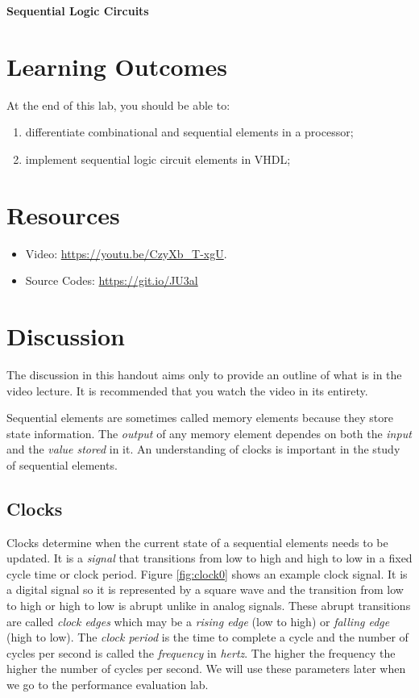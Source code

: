 \documentclass[a4paper, 11pt,oneside]{article}
\begin{document}
\begin{center}
	{\LARGE \textbf{Sequential Logic Circuits}}
\end{center}

\section*{Learning Outcomes}
   At the end of this lab, you should be able to:
   \begin{enumerate}[itemsep=0pt,parsep=0pt]
   	   \item differentiate combinational and sequential elements in a processor;
       \item implement sequential logic circuit elements in VHDL;
   \end{enumerate}   
\tableofcontents

\section{Resources}
\begin{itemize}
	\item Video: \href{https://youtu.be/CzyXb_T-xgU}{https://youtu.be/CzyXb\_T-xgU}.
	\item Source Codes: \href{https://git.io/JU3al}{https://git.io/JU3al}
\end{itemize}	


\section{Discussion}
The discussion in this handout aims only to provide an outline of what is in 
the video lecture. It is recommended that you watch the video in its entirety.

Sequential elements are sometimes called memory elements because they store 
state information. The\textit{ output} of any memory element dependes on both 
the \textit{input} and the \textit{value stored} in it. An understanding of 
clocks is important in the study of sequential elements. 

\subsection{Clocks}
Clocks determine when the current state of a sequential elements needs to be
updated. It is a \textit{signal} that transitions from low to high and high to
low in a fixed cycle time or clock period. Figure \ref{fig:clock0} shows an
example clock signal. It is a digital signal so it is represented by a square 
wave and the transition from low to high or high to low is abrupt unlike in 
analog signals. These abrupt transitions are called \textit{clock edges} which 
may be a \textit{rising edge} (low to high) or \textit{falling edge} (high to
low). The \textit{clock period} is the time to complete a cycle and the number 
of cycles per second is called the \textit{frequency} in \textit{hertz}. The 
higher the frequency the higher the number of cycles per second. We will use 
these parameters later when we go to the performance evaluation lab. 
\end{document}
